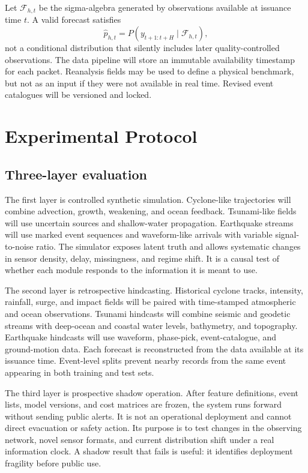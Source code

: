 \documentclass[conference]{IEEEtran}
\begin{document}
Let $\mathcal{F}_{h,t}$ be the sigma-algebra generated by observations available at issuance time $t$. A valid forecast satisfies
\begin{equation}
 \widehat p_{h,t}=P(y_{t+1:t+H}\mid\mathcal{F}_{h,t}),
 \label{eq:filtration}
\end{equation}
not a conditional distribution that silently includes later quality-controlled observations. The data pipeline will store an immutable availability timestamp for each packet. Reanalysis fields may be used to define a physical benchmark, but not as an input if they were not available in real time. Revised event catalogues will be versioned and locked.

\section{Experimental Protocol}

\subsection{Three-layer evaluation}

The first layer is controlled synthetic simulation. Cyclone-like trajectories will combine advection, growth, weakening, and ocean feedback. Tsunami-like fields will use uncertain sources and shallow-water propagation. Earthquake streams will use marked event sequences and waveform-like arrivals with variable signal-to-noise ratio. The simulator exposes latent truth and allows systematic changes in sensor density, delay, missingness, and regime shift. It is a causal test of whether each module responds to the information it is meant to use.

The second layer is retrospective hindcasting. Historical cyclone tracks, intensity, rainfall, surge, and impact fields will be paired with time-stamped atmospheric and ocean observations. Tsunami hindcasts will combine seismic and geodetic streams with deep-ocean and coastal water levels, bathymetry, and topography. Earthquake hindcasts will use waveform, phase-pick, event-catalogue, and ground-motion data. Each forecast is reconstructed from the data available at its issuance time. Event-level splits prevent nearby records from the same event appearing in both training and test sets.

The third layer is prospective shadow operation. After feature definitions, event lists, model versions, and cost matrices are frozen, the system runs forward without sending public alerts. It is not an operational deployment and cannot direct evacuation or safety action. Its purpose is to test changes in the observing network, novel sensor formats, and current distribution shift under a real information clock. A shadow result that fails is useful: it identifies deployment fragility before public use.
\end{document}
